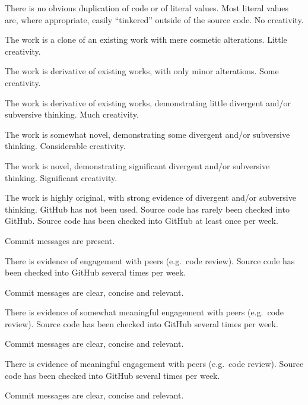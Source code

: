 \documentclass{fal_assignment}
\begin{document}
\begin{markingrubric}
             \par There is no obvious duplication of code or of literal values. Most literal values are, where appropriate, easily ``tinkered'' outside of the source code.  
%
        \grade\fail No creativity.
            \par The work is a clone of an existing work with mere cosmetic alterations.
        \grade Little creativity.
            \par The work is derivative of existing works, with only minor alterations.
        \grade Some creativity.
            \par The work is derivative of existing works, demonstrating little divergent and/or subversive thinking.
        \grade Much creativity.
            \par The work is somewhat novel, demonstrating some divergent and/or subversive thinking.
        \grade Considerable creativity.
            \par The work is novel, demonstrating significant divergent and/or subversive thinking.
        \grade Significant creativity.
            \par The work is highly original, with strong evidence of divergent and/or subversive thinking.
%
        \grade\fail GitHub has not been used.
        \grade Source code has rarely been checked into GitHub.
        \grade Source code  has been checked into GitHub at least once per week.
            \par Commit messages are present.
            \par There is evidence of engagement with peers (e.g.\ code review).
        \grade Source code  has been checked into GitHub several times per week.
            \par Commit messages are clear, concise and relevant.
            \par There is evidence of somewhat meaningful engagement with peers (e.g.\ code review).
        \grade Source code has been checked into GitHub several times per week.
            \par Commit messages are clear, concise and relevant.
            \par There is evidence of meaningful engagement with peers (e.g.\ code review).
        \grade Source code has been checked into GitHub several times per week.
            \par Commit messages are clear, concise and relevant.

\end{markingrubric}
\end{document}
